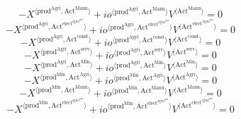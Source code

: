 \begin{equation}
-{X}^{\langle \mathrm{prod}^{\mathrm{Agri}},\mathrm{Act}^{\mathrm{Manu}}\rangle} + {{{i\!o}}^{\langle \mathrm{\mathrm{prod}^{\mathrm{Agri}}},\mathrm{\mathrm{Act}^{\mathrm{Manu}}}\rangle}} {{V}^{\langle \mathrm{Act}^{\mathrm{Manu}}\rangle}} = 0
\end{equation}
\begin{equation}
-{X}^{\langle \mathrm{prod}^{\mathrm{Agri}},\mathrm{Act}^{\mathrm{elect}^{\mathrm{agua}^{\mathrm{gas}}}}\rangle} + {{{i\!o}}^{\langle \mathrm{\mathrm{prod}^{\mathrm{Agri}}},\mathrm{\mathrm{Act}^{\mathrm{elect}^{\mathrm{agua}^{\mathrm{gas}}}}}\rangle}} {{V}^{\langle \mathrm{Act}^{\mathrm{elect}^{\mathrm{agua}^{\mathrm{gas}}}}\rangle}} = 0
\end{equation}
\begin{equation}
-{X}^{\langle \mathrm{prod}^{\mathrm{Agri}},\mathrm{Act}^{\mathrm{const}}\rangle} + {{{i\!o}}^{\langle \mathrm{\mathrm{prod}^{\mathrm{Agri}}},\mathrm{\mathrm{Act}^{\mathrm{const}}}\rangle}} {{V}^{\langle \mathrm{Act}^{\mathrm{const}}\rangle}} = 0
\end{equation}
\begin{equation}
-{X}^{\langle \mathrm{prod}^{\mathrm{Agri}},\mathrm{Act}^{\mathrm{serv}}\rangle} + {{{i\!o}}^{\langle \mathrm{\mathrm{prod}^{\mathrm{Agri}}},\mathrm{\mathrm{Act}^{\mathrm{serv}}}\rangle}} {{V}^{\langle \mathrm{Act}^{\mathrm{serv}}\rangle}} = 0
\end{equation}
\begin{equation}
-{X}^{\langle \mathrm{prod}^{\mathrm{Agri}},\mathrm{Act}^{\mathrm{Min}}\rangle} + {{{i\!o}}^{\langle \mathrm{\mathrm{prod}^{\mathrm{Agri}}},\mathrm{\mathrm{Act}^{\mathrm{Min}}}\rangle}} {{V}^{\langle \mathrm{Act}^{\mathrm{Min}}\rangle}} = 0
\end{equation}
\begin{equation}
-{X}^{\langle \mathrm{prod}^{\mathrm{Min}},\mathrm{Act}^{\mathrm{Agri}}\rangle} + {{{i\!o}}^{\langle \mathrm{\mathrm{prod}^{\mathrm{Min}}},\mathrm{\mathrm{Act}^{\mathrm{Agri}}}\rangle}} {{V}^{\langle \mathrm{Act}^{\mathrm{Agri}}\rangle}} = 0
\end{equation}
\begin{equation}
-{X}^{\langle \mathrm{prod}^{\mathrm{Min}},\mathrm{Act}^{\mathrm{Manu}}\rangle} + {{{i\!o}}^{\langle \mathrm{\mathrm{prod}^{\mathrm{Min}}},\mathrm{\mathrm{Act}^{\mathrm{Manu}}}\rangle}} {{V}^{\langle \mathrm{Act}^{\mathrm{Manu}}\rangle}} = 0
\end{equation}
\begin{equation}
-{X}^{\langle \mathrm{prod}^{\mathrm{Min}},\mathrm{Act}^{\mathrm{elect}^{\mathrm{agua}^{\mathrm{gas}}}}\rangle} + {{{i\!o}}^{\langle \mathrm{\mathrm{prod}^{\mathrm{Min}}},\mathrm{\mathrm{Act}^{\mathrm{elect}^{\mathrm{agua}^{\mathrm{gas}}}}}\rangle}} {{V}^{\langle \mathrm{Act}^{\mathrm{elect}^{\mathrm{agua}^{\mathrm{gas}}}}\rangle}} = 0
\end{equation}
